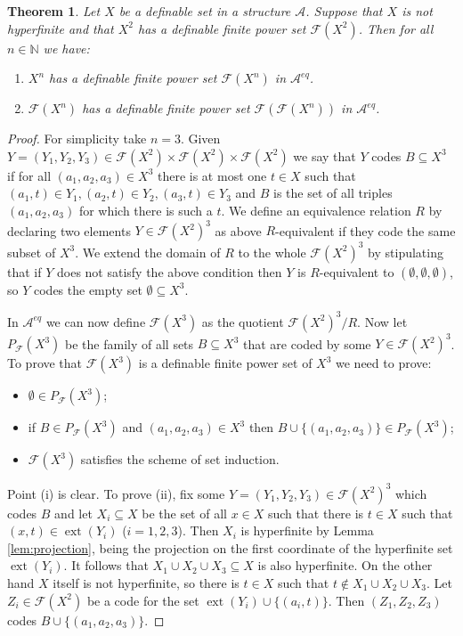 \documentclass{amsart}
\newcommand{\N}{\mathbb N}
\newcommand{\A}{\mathcal A}
\newcommand{\ca}{\mathcal}
\newcommand{\nin}{\not \in}
\theoremstyle{plain}
\newtheorem{thm}{Theorem}[section]
\theoremstyle{definition}
\newcommand{\F}{\mathcal{F}}
\newcommand{\ext}[1]{\operatorname{ext}(#1)}
\begin{document}
\begin{thm} \label{thm:F2}
Let $X$ be a definable set in a structure $\ca A$. Suppose that $X$ is not hyperfinite and that $X^2$ has a definable finite power set $\F(X^2)$. Then for all $n\in \N$ we have: 
\begin{enumerate}
\item $X^n$ has a definable finite power set $\F(X^n)$ in $\ca A^{eq}$. 
\item $\F(X^n)$ has a definable finite power set $\F(\F(X^n))$ in $\ca A^{eq}$. 
\end{enumerate}
\end{thm}
\begin{proof}
For simplicity take $n=3$. Given $Y = (Y_1, Y_2, Y_3) \in \F(X^2)\times \F(X^2) \times \F(X^2)$ we say that $Y$ codes $B \subseteq X^3$ if for all $(a_1,a_2,a_3) \in X^3$ there is at most one $t\in X$ such that $(a_1,t)\in Y_1, (a_2,t)\in Y_2, (a_3,t)\in Y_3$ and $B$ is the set of all triples $(a_1,a_2,a_3)$ for which there is such a $t$. We define an equivalence relation $R$ by declaring two elements $Y\in \F(X^2)^3$ as above $R$-equivalent if they code the same subset of $X^3$. We extend the domain of $R$ to the whole $\F(X^2)^3$ by stipulating that if $Y$ does not satisfy the above condition then $Y$ is $R$-equivalent to $(\emptyset, \emptyset, \emptyset)$, so $Y$ codes the empty set $\emptyset \subseteq X^3$. 

In $\A^{eq}$ we can now define $\F(X^3)$ as the quotient $\F(X^2)^3/R$.
Now let $P_\F(X^3)$ be the family of all sets $B\subseteq X^3$ that are coded by some $Y \in \F(X^2)^3$. To prove that $\F(X^3)$ is a definable finite power set of $X^3$ we need to prove: 
\begin{itemize}
    \item[(i)] $\emptyset \in P_{\F}(X^3)$;
    \item[(ii)] if $B \in P_{\F}(X^3)$ and $(a_1,a_2,a_3)\in X^3$ then $B \cup \{(a_1,a_2,a_3) \}\in P_\F(X^3)$;
    \item[(iii)] $\F(X^3)$ satisfies the scheme of set induction. 
\end{itemize} 
Point (i) is clear. 
To prove (ii), fix some $Y=(Y_1,Y_2,Y_3) \in \F(X^2)^3$ which codes $B$ and let $X_i \subseteq X$ be the set of all $x\in X$ such that there is $t\in X$ such that $(x,t)\in \ext {Y_i}$ ($i=1,2,3$). Then $X_i$ is hyperfinite by Lemma \ref{lem:projection}, being the projection on the first coordinate of the hyperfinite set $\ext{Y_i}$. It follows that $X_1 \cup X_2 \cup X_3 \subseteq X$ is also hyperfinite. On the other hand $X$ itself is not hyperfinite, so there is $t\in X$ such that $t\nin X_1 \cup X_2 \cup X_3$. Let $Z_i \in \F(X^2)$ be a code for the set $\ext {Y_i}\cup \{(a_i, t)\}$. Then $(Z_1, Z_2, Z_3)$ codes $B \cup \{(a_1,a_2,a_3)\}$. 


\end{proof}
\end{document}

